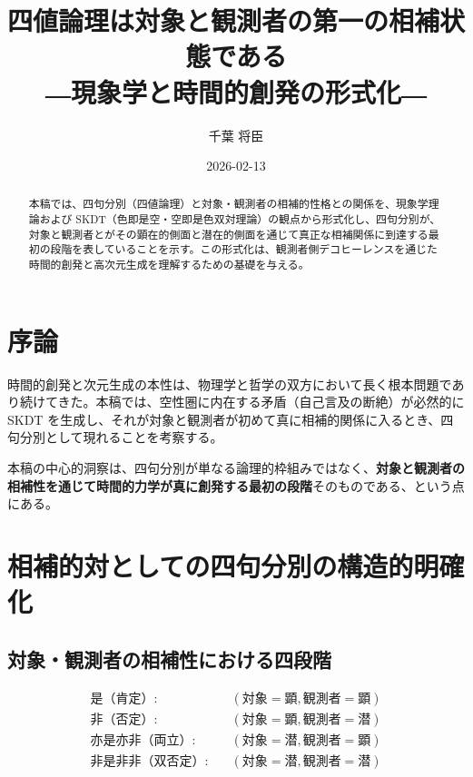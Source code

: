 \documentclass[12pt,a4paper]{article}
\title{四値論理は対象と観測者の第一の相補状態である\\
―現象学と時間的創発の形式化―}
\author{千葉 将臣}
\date{2026-02-13}
\theoremstyle{definition}
\begin{document}
\maketitle

\begin{abstract}
本稿では、四句分別（四値論理）と対象・観測者の相補的性格との関係を、現象学理論および SKDT（色即是空・空即是色双対理論）の観点から形式化し、四句分別が、対象と観測者とがその顕在的側面と潜在的側面を通じて真正な相補関係に到達する最初の段階を表していることを示す。この形式化は、観測者側デコヒーレンスを通じた時間的創発と高次元生成を理解するための基礎を与える。
\end{abstract}

\section{序論}

時間的創発と次元生成の本性は、物理学と哲学の双方において長く根本問題であり続けてきた。本稿では、空性圏に内在する矛盾（自己言及の断絶）が必然的に SKDT を生成し、それが対象と観測者が初めて真に相補的関係に入るとき、四句分別として現れることを考察する。

本稿の中心的洞察は、四句分別が単なる論理的枠組みではなく、\textbf{対象と観測者の相補性を通じて時間的力学が真に創発する最初の段階}そのものである、という点にある。

\section{相補的対としての四句分別の構造的明確化}

\subsection{対象・観測者の相補性における四段階}

\begin{equation}
\begin{aligned}
\text{是（肯定）:} \quad &(\text{対象} = \text{顕}, \text{観測者} = \text{顕}) \\
\text{非（否定）:} \quad &(\text{対象} = \text{顕}, \text{観測者} = \text{潜}) \\
\text{亦是亦非（両立）:} \quad &(\text{対象} = \text{潜}, \text{観測者} = \text{顕}) \\
\text{非是非非（双否定）:} \quad &(\text{対象} = \text{潜}, \text{観測者} = \text{潜})
\end{aligned}
\end{equation}
\end{document}
